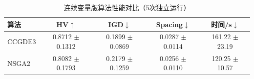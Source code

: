 \begin{table}[H]
\centering
\caption{连续变量版算法性能对比（5次独立运行）}
\label{tab:continuous-comparison}
\begin{tabular}{lcccc}
\toprule
算法 & HV$\uparrow$ & IGD$\downarrow$ & Spacing$\downarrow$ & 时间/s$\downarrow$ \\
\midrule
CCGDE3 & 0.8712 $\pm$ 0.1312 & 0.1899 $\pm$ 0.0869 & 0.0287 $\pm$ 0.0114 & 161.22 $\pm$ 23.19 \\
NSGA2 & 0.8082 $\pm$ 0.1793 & 0.2179 $\pm$ 0.1259 & 0.0256 $\pm$ 0.0110 & 120.25 $\pm$ 10.57 \\
\bottomrule
\end{tabular}
\end{table}
